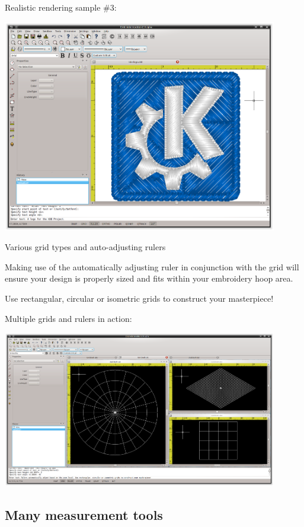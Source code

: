 \documentclass[a4paper, 11pt]{report}
\begin{document}
Realistic rendering sample \#3:

\includegraphics[width=0.9\textwidth]{images/features-realrender-3.png}

Various grid types and auto-adjusting rulers

Making use of the automatically adjusting ruler in conjunction with the grid will ensure your design is properly sized and fits within your embroidery hoop area.

Use rectangular, circular or isometric grids to construct your masterpiece!

Multiple grids and rulers in action:

\includegraphics[width=0.9\textwidth]{images/features-grid-ruler-1.png}

\subsection{Many measurement tools}
\end{document}
